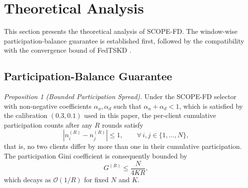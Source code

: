 \documentclass[journal]{IEEEtran}
\begin{document}
\section{Theoretical Analysis}
\label{sec:theory}

This section presents the theoretical analysis of SCOPE-FD. The window-wise participation-balance guarantee is established first, followed by the compatibility with the convergence bound of FedTSKD \cite{mu2024fedtskd}.

\subsection{Participation-Balance Guarantee}
\label{ssec:participation-balance}

\textit{Proposition 1 (Bounded Participation Spread).} Under the SCOPE-FD selector with non-negative coefficients $\alpha_u, \alpha_d$ such that $\alpha_u + \alpha_d < 1$, which is satisfied by the calibration $(0.3, 0.1)$ used in this paper, the per-client cumulative participation counts after any $R$ rounds satisfy
\begin{equation}
\left| n_i^{(R)} - n_j^{(R)} \right| \le 1, \qquad \forall\, i,j \in \{1,\dots,N\},
\label{eq:spread}
\end{equation}
that is, no two clients differ by more than one in their cumulative participation. The participation Gini coefficient is consequently bounded by
\begin{equation}
G^{(R)} \le \frac{N}{4KR},
\label{eq:gini_bound}
\end{equation}
which decays as $\mathcal{O}(1/R)$ for fixed $N$ and $K$.
\end{document}
